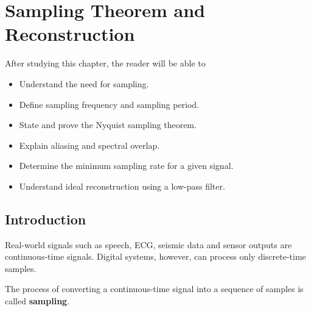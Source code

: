 
\chapter{Sampling Theorem and Reconstruction}

\begin{tcolorbox}[colback=blue!5!white,colframe=blue!70!black,title=Learning Objectives]

After studying this chapter, the reader will be able to

\begin{itemize}
\item Understand the need for sampling.
\item Define sampling frequency and sampling period.
\item State and prove the Nyquist sampling theorem.
\item Explain aliasing and spectral overlap.
\item Determine the minimum sampling rate for a given signal.
\item Understand ideal reconstruction using a low-pass filter.
\end{itemize}

\end{tcolorbox}


\section{Introduction}

Real-world signals such as speech, ECG, seismic data and sensor outputs are
continuous-time signals. Digital systems, however, can process only discrete-time
samples.

The process of converting a continuous-time signal into a sequence of samples is
called \textbf{sampling}.

\begin{center}
\end{center}

